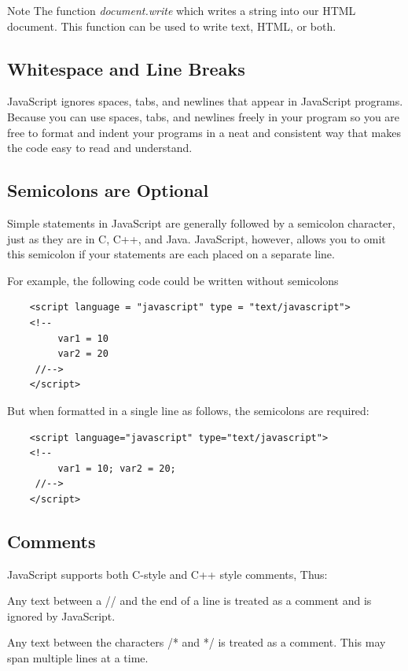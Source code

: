 \documentclass[11pt,a4paper]{article}
\begin{document}
\begin{bclogo}[couleur=blue!5, arrondi=0.3, logo=\bctrombone]{Note}
The function \emph{document.write} which writes a string into our HTML document. This function can be used to write text, HTML, or both.
\end{bclogo}

\subsection*{Whitespace and Line Breaks}
JavaScript ignores spaces, tabs, and newlines that appear in JavaScript programs.
Because you can use spaces, tabs, and newlines freely in your program so you are free to format and indent your programs in a neat and consistent way that makes the code easy to read and understand.

\subsection*{Semicolons are Optional}
Simple statements in JavaScript are generally followed by a semicolon character, just as they are in C, C++, and Java. JavaScript, however, allows you to omit this semicolon if your statements are each placed on a separate line. 

For example, the following code could be written without semicolons
\begin{verbatim}
    <script language = "javascript" type = "text/javascript">
    <!--
         var1 = 10
         var2 = 20
     //-->
    </script>
\end{verbatim}

But when formatted in a single line as follows, the semicolons are required:
\begin{verbatim}
    <script language="javascript" type="text/javascript">
    <!--
         var1 = 10; var2 = 20;
     //-->
    </script>
\end{verbatim}

\subsection*{Comments}

JavaScript supports both C-style and C++ style comments, Thus:

Any text between a // and the end of a line is treated as a comment and is ignored by JavaScript.

Any text between the characters /* and */ is treated as a comment. This may span multiple lines at a time.
\end{document}
